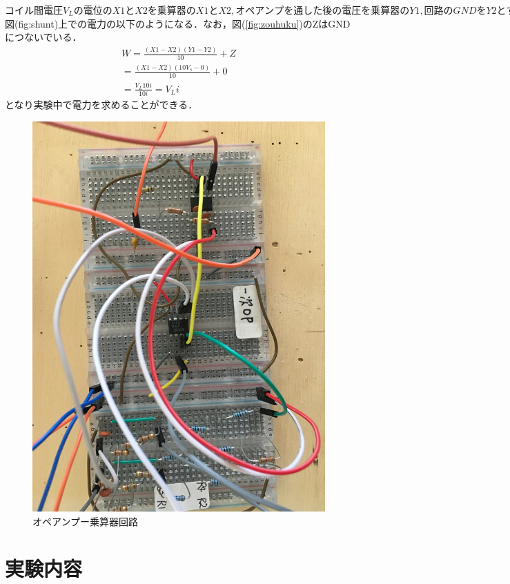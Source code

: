 \documentclass[12pt]{jarticle}
\begin{document}
$コイル間電圧V_Lの電位のX1とX2を乗算器のX1とX2,オペアンプを通した後の電圧を乗算器のY1,回路のGNDをY2とすると，$図(fig:shunt)上での電力の以下のようになる．なお，図(\ref{fig:zouhuku})のZはGNDにつないでいる．
\begin{eqnarray}
W=\frac{(X1-X2)(Y1-Y2)}{10}+Z \nonumber \\
=\frac{(X1-X2)(10V_s-0)}{10}+0 \nonumber \\
=\frac{V_L10i}{10i}=V_Li
\end{eqnarray}
となり実験中で電力を求めることができる．
\begin{figure}[H]
	\centering
	\includegraphics[scale=0.1,angle=180]{op_multi.JPG}
	\caption{オペアンプー乗算器回路}
	\label{fig:op_multi}
\end{figure}
 \clearpage
\section{実験内容}
\end{document}
